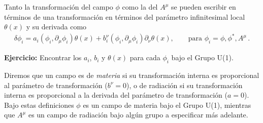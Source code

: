 \begin{frame}
Tanto la transformación del campo $\phi$ como la del $A^{\mu}$ se pueden escribir en términos de una transformación en términos del parámetro infinitesimal local $\theta(x)$ y su derivada como
\begin{align}
\label{eq:dfi}
  \delta\phi_i= a_{i}\left( \phi_{i},\partial_{\mu}\phi_{i} \right) \theta(x)+b^{\nu}_i \left( \phi_{i},\partial_{\mu}\phi_{i} \right) \partial_{\nu}\theta(x),\qquad \text{para $\phi_{i}=\phi,\phi^{*},A^{\mu}$}\,.
\end{align}
\end{frame}
\textbf{Ejercicio:} Encontrar los $a_i$, $b_i$ y  $\theta(x)$ para cada $\phi_i$ bajo el Grupo U(1).

Diremos que un campo es de \emph{materia} si su transformación interna es proporcional al parámetro de transformación ($b^{\nu}=0$), o de radiación si su transformación interna es proporcional a la derivada del parámetro de transformación ($a=0$). Bajo estas definiciones $\phi$ es un campo de materia bajo el Grupo U(1), mientras que $A^{\mu}$ es un campo de radiación bajo algún grupo a especificar más adelante. 

